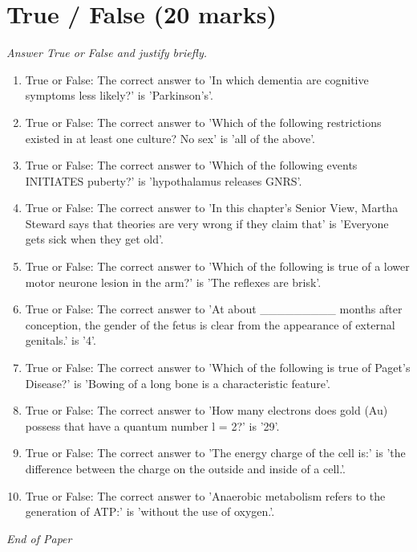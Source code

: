 \documentclass[12pt]{article}
\begin{document}
\section*{True / False (20 marks)}
\textit{Answer True or False and justify briefly.}
\begin{enumerate}[label=\arabic*.]
\item True or False: The correct answer to 'In which dementia are cognitive symptoms less likely?' is 'Parkinson's'.
\item True or False: The correct answer to 'Which of the following restrictions existed in at least one culture? No sex' is 'all of the above'.
\item True or False: The correct answer to 'Which of the following events INITIATES puberty?' is 'hypothalamus releases GNRS'.
\item True or False: The correct answer to 'In this chapter's Senior View, Martha Steward says that theories are very wrong if they claim that' is 'Everyone gets sick when they get old'.
\item True or False: The correct answer to 'Which of the following is true of a lower motor neurone lesion in the arm?' is 'The reflexes are brisk'.
\item True or False: The correct answer to 'At about \_\_\_\_\_\_\_\_\_ months after conception, the gender of the fetus is clear from the appearance of external genitals.' is '4'.
\item True or False: The correct answer to 'Which of the following is true of Paget's Disease?' is 'Bowing of a long bone is a characteristic feature'.
\item True or False: The correct answer to 'How many electrons does gold (Au) possess that have a quantum number l = 2?' is '29'.
\item True or False: The correct answer to 'The energy charge of the cell is:' is 'the difference between the charge on the outside and inside of a cell.'.
\item True or False: The correct answer to 'Anaerobic metabolism refers to the generation of ATP:' is 'without the use of oxygen.'.
\end{enumerate}

\vfill
\noindent\textit{End of Paper}
\end{document}
